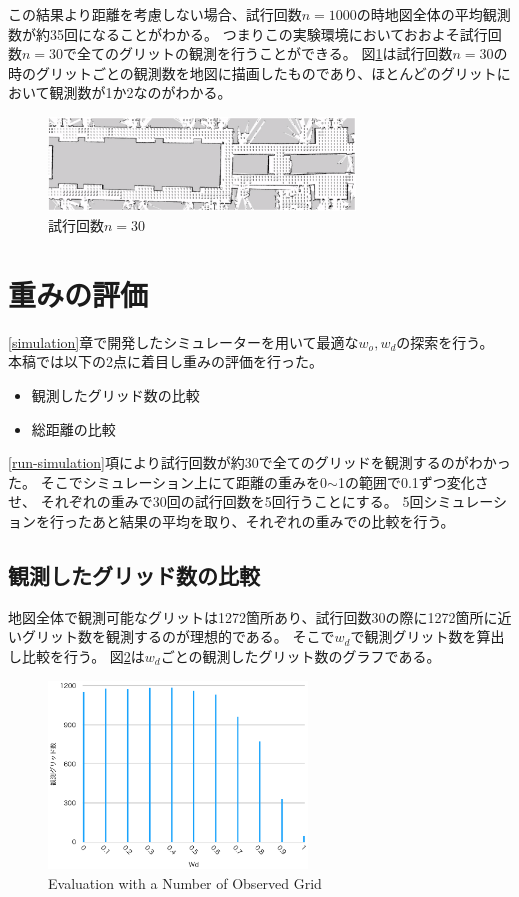 \documentclass{jsarticle}
\begin{document}
この結果より距離を考慮しない場合、試行回数$n=1000$の時地図全体の平均観測数が約35回になることがわかる。
つまりこの実験環境においておおよそ試行回数$n=30$で全てのグリットの観測を行うことができる。
図\ref{fig: n30}は試行回数$n=30$の時のグリットごとの観測数を地図に描画したものであり、ほとんどのグリットにおいて観測数が1か2なのがわかる。


\begin{figure}[tbh]
 \centering
  \includegraphics[height=25mm]{fig/n30.eps}
  \vspace*{-4mm}
  \caption{試行回数$n=30$}
  \label{fig: n30}
\end{figure}




\section{重みの評価}
\label{evaluate-weight}
\ref{simulation}章で開発したシミュレーターを用いて最適な$w_o,w_d$の探索を行う。
本稿では以下の2点に着目し重みの評価を行った。
\begin{itemize}
	\item 観測したグリッド数の比較
	\item 総距離の比較
\end{itemize}
\ref{run-simulation}項により試行回数が約30で全てのグリッドを観測するのがわかった。
そこでシミュレーション上にて距離の重みを0$\sim$1の範囲で0.1ずつ変化させ、
それぞれの重みで30回の試行回数を5回行うことにする。
5回シミュレーションを行ったあと結果の平均を取り、それぞれの重みでの比較を行う。


\subsection{観測したグリッド数の比較}
\label{evaluate-observation}
地図全体で観測可能なグリットは1272箇所あり、試行回数30の際に1272箇所に近いグリット数を観測するのが理想的である。
そこで$w_d$で観測グリット数を算出し比較を行う。
図\ref{fig: evaluate-observation}は$w_d$ごとの観測したグリット数のグラフである。


\begin{figure}[tbh]
 \centering
  \includegraphics[height=50mm]{fig/evaluate-grid.eps}
  \vspace*{-4mm}
  \caption{Evaluation with a Number of Observed Grid}
  \label{fig: evaluate-observation}
\end{figure}
\end{document}
